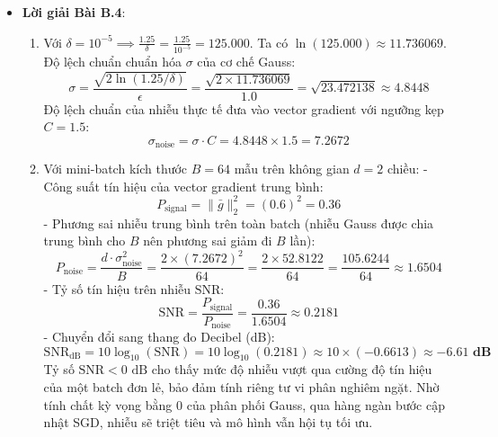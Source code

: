 \begin{itemize}
  \item \textbf{Lời giải Bài B.4}:
  \begin{enumerate}
    \item Với $\delta = 10^{-5} \implies \frac{1.25}{\delta} = \frac{1.25}{10^{-5}} = 125.000$.
    Ta có $\ln(125.000) \approx 11.736069$.
    Độ lệch chuẩn chuẩn hóa $\sigma$ của cơ chế Gauss:
    \begin{equation*}
    \sigma = \frac{\sqrt{2 \ln(1.25 / \delta)}}{\epsilon} = \frac{\sqrt{2 \times 11.736069}}{1.0} = \sqrt{23.472138} \approx \mathbf{4.8448}
    \end{equation*}
    Độ lệch chuẩn của nhiễu thực tế đưa vào vector gradient với ngưỡng kẹp $C = 1.5$:
    \begin{equation*}
    \sigma_{\text{noise}} = \sigma \cdot C = 4.8448 \times 1.5 = \mathbf{7.2672}
    \end{equation*}
    \item Với mini-batch kích thước $B = 64$ mẫu trên không gian $d = 2$ chiều:
    - Công suất tín hiệu của vector gradient trung bình:
      \begin{equation*}
      P_{\text{signal}} = \|\bar{g}\|_2^2 = (0.6)^2 = \mathbf{0.36}
      \end{equation*}
    - Phương sai nhiễu trung bình trên toàn batch (nhiễu Gauss được chia trung bình cho $B$ nên phương sai giảm đi $B$ lần):
      \begin{equation*}
      P_{\text{noise}} = \frac{d \cdot \sigma_{\text{noise}}^2}{B} = \frac{2 \times (7.2672)^2}{64} = \frac{2 \times 52.8122}{64} = \frac{105.6244}{64} \approx \mathbf{1.6504}
      \end{equation*}
    - Tỷ số tín hiệu trên nhiễu $\text{SNR}$:
      \begin{equation*}
      \text{SNR} = \frac{P_{\text{signal}}}{P_{\text{noise}}} = \frac{0.36}{1.6504} \approx \mathbf{0.2181}
      \end{equation*}
    - Chuyển đổi sang thang đo Decibel (dB):
      \begin{equation*}
      \text{SNR}_{\text{dB}} = 10 \log_{10}(\text{SNR}) = 10 \log_{10}(0.2181) \approx 10 \times (-0.6613) \approx \mathbf{-6.61 \text{ dB}}
      \end{equation*}
    Tỷ số $\text{SNR} < 0\text{ dB}$ cho thấy mức độ nhiễu vượt qua cường độ tín hiệu của một batch đơn lẻ, bảo đảm tính riêng tư vi phân nghiêm ngặt. Nhờ tính chất kỳ vọng bằng 0 của phân phối Gauss, qua hàng ngàn bước cập nhật SGD, nhiễu sẽ triệt tiêu và mô hình vẫn hội tụ tối ưu.
  \end{enumerate}


\end{itemize}
